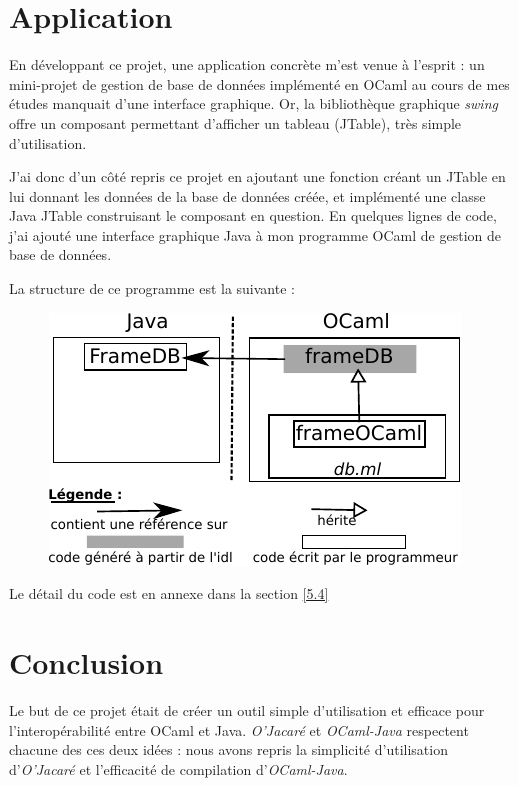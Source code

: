\documentclass[a4paper, 11pt]{article}
\begin{document}
\section{Application}

En développant ce projet, une application concrète m'est venue à l'esprit : un mini-projet de gestion de base de données implémenté en OCaml au cours de mes études manquait d'une interface graphique. Or, la bibliothèque graphique \emph{swing} offre un composant permettant d'afficher un tableau (JTable), très simple d'utilisation.

J'ai donc d'un côté repris ce projet en ajoutant une fonction créant un JTable en lui donnant les données de la base de données créée, et implémenté une classe Java JTable construisant le composant en question.
En quelques lignes de code, j'ai ajouté une interface graphique Java à mon programme OCaml de gestion de base de données.


La structure de ce programme est la suivante :

\begin{figure}[h!]
  \centering
  \includegraphics{exempleDB.pdf}
\end{figure}

Le détail du code est en annexe dans la section \ref{5.4}


\newpage
\section*{Conclusion}


Le but de ce projet
était de créer un outil simple d'utilisation et efficace pour l'interopérabilité entre OCaml et Java.
\emph{O'Jacaré} et \emph{OCaml-Java} respectent chacune des ces deux
idées : nous avons repris la simplicité d'utilisation
d'\emph{O'Jacaré} et l'efficacité de compilation d'\emph{OCaml-Java}.
\end{document}
